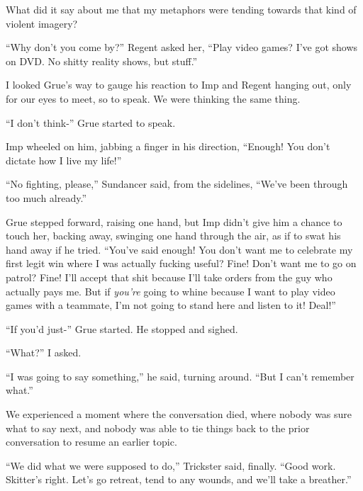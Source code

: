 What did it say about me that my metaphors were tending towards that kind of violent imagery?



``Why don't you come by?'' Regent asked her, ``Play video games?  I've got shows on DVD.  No shitty reality shows, but stuff.''



I looked Grue's way to gauge his reaction to Imp and Regent hanging out, only for our eyes to meet, so to speak.  We were thinking the same thing.



``I don't think-'' Grue started to speak.



Imp wheeled on him, jabbing a finger in his direction, ``Enough!  You don't dictate how I live my life!''



``No fighting, please,'' Sundancer said, from the sidelines, ``We've been through too much already.''



Grue stepped forward, raising one hand, but Imp didn't give him a chance to touch her, backing away, swinging one hand through the air, as if to swat his hand away if he tried.  ``You've said enough!  You don't want me to celebrate my first legit win where I was actually fucking useful?  Fine!  Don't want me to go on patrol?  Fine!  I'll accept that shit because I'll take orders from the guy who actually pays me.  But if \emph{you're} going to whine because I want to play video games with a teammate, I'm not going to stand here and listen to it!  Deal!''



``If you'd just-'' Grue started.  He stopped and sighed.



``What?'' I asked.



``I was going to say something,'' he said, turning around.  ``But I can't remember what.''



We experienced a moment where the conversation died, where nobody was sure what to say next, and nobody was able to tie things back to the prior conversation to resume an earlier topic.



``We did what we were supposed to do,'' Trickster said, finally.  ``Good work.  Skitter's right.  Let's go retreat, tend to any wounds, and we'll take a breather.''




